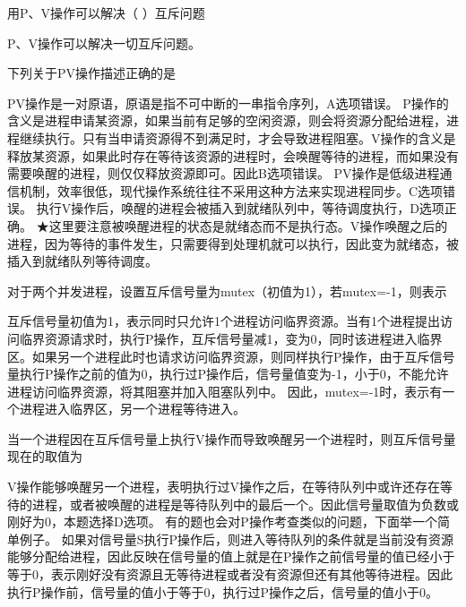 \question 用P、V操作可以解决（ ）互斥问题
\par{}
\begin{solution}P、V操作可以解决一切互斥问题。
\end{solution}
\question 下列关于PV操作描述正确的是
\par{}
\begin{solution}PV操作是一对原语，原语是指不可中断的一串指令序列，A选项错误。
P操作的含义是进程申请某资源，如果当前有足够的空闲资源，则会将资源分配给进程，进程继续执行。只有当申请资源得不到满足时，才会导致进程阻塞。V操作的含义是释放某资源，如果此时存在等待该资源的进程时，会唤醒等待的进程，而如果没有需要唤醒的进程，则仅仅释放资源即可。因此B选项错误。
PV操作是低级进程通信机制，效率很低，现代操作系统往往不采用这种方法来实现进程同步。C选项错误。
执行V操作后，唤醒的进程会被插入到就绪队列中，等待调度执行，D选项正确。
★这里要注意被唤醒进程的状态是就绪态而不是执行态。V操作唤醒之后的进程，因为等待的事件发生，只需要得到处理机就可以执行，因此变为就绪态，被插入到就绪队列等待调度。
\end{solution}
\question 对于两个并发进程，设置互斥信号量为mutex（初值为1），若mutex=-1，则表示
\par{}
\begin{solution}互斥信号量初值为1，表示同时只允许1个进程访问临界资源。当有1个进程提出访问临界资源请求时，执行P操作，互斥信号量减1，变为0，同时该进程进入临界区。如果另一个进程此时也请求访问临界资源，则同样执行P操作，由于互斥信号量执行P操作之前的值为0，执行过P操作后，信号量值变为-1，小于0，不能允许进程访问临界资源，将其阻塞并加入阻塞队列中。
因此，mutex=-1时，表示有一个进程进入临界区，另一个进程等待进入。
\end{solution}
\question 当一个进程因在互斥信号量上执行V操作而导致唤醒另一个进程时，则互斥信号量现在的取值为
\par{}
\begin{solution}V操作能够唤醒另一个进程，表明执行过V操作之后，在等待队列中或许还存在等待的进程，或者被唤醒的进程是等待队列中的最后一个。因此信号量取值为负数或刚好为0，本题选择D选项。
有的题也会对P操作考查类似的问题，下面举一个简单例子。
如果对信号量S执行P操作后，则进入等待队列的条件就是当前没有资源能够分配给进程，因此反映在信号量的值上就是在P操作之前信号量的值已经小于等于0，表示刚好没有资源且无等待进程或者没有资源但还有其他等待进程。因此执行P操作前，信号量的值小于等于0，执行过P操作之后，信号量的值小于0。
\end{solution}
